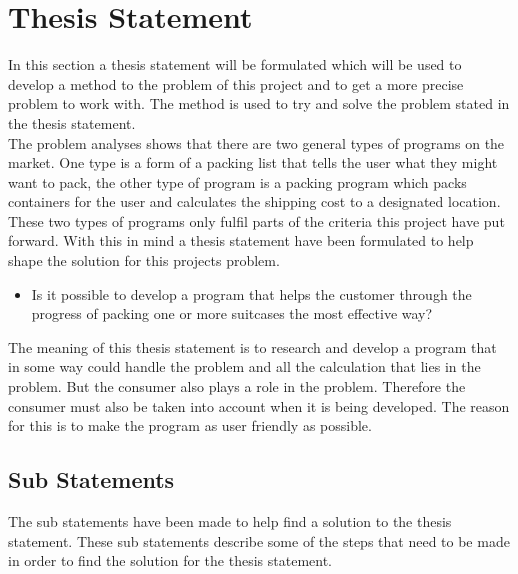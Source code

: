 \section{Thesis Statement}
In this section a thesis statement will be formulated which will be used to develop a method to the problem of this project and to get a more precise problem to work with. The method is used to try and solve the problem stated in the thesis statement.\\
The problem analyses shows that there are two general types of programs on the market. One type is a form of a packing list that tells the user what they might want to pack, the other type of program is a packing program which packs containers for the user and calculates the shipping cost to a designated location. These two types of programs only fulfil parts of the criteria this project have put forward. With this in mind a thesis statement have been formulated to help shape the solution for this projects problem.

\begin{itemize}
\item Is it possible to develop a program that helps the customer through the progress of packing one or more suitcases the most effective way?
\end{itemize}

The meaning of this thesis statement is to research and develop a program that in some way could handle the problem and all the calculation that lies in the problem. But the consumer also plays a role in the problem.
Therefore the consumer must also be taken into account when it is being developed. The reason for this is to make the program as user friendly as possible.

\subsection*{Sub Statements}
The sub statements have been made to help find a solution to the thesis statement. These sub statements describe some of the steps that need to be made in order to find the solution for the thesis statement.

